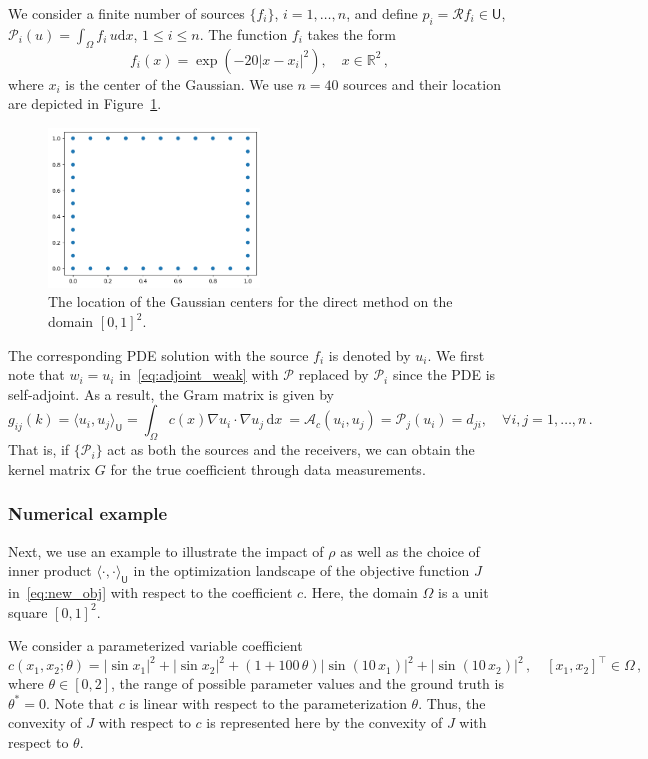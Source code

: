 \documentclass[12pt]{amsart}
\newcommand{\rd}{\mathrm{d}}
\begin{document}
We consider a finite number of sources $\{f_i\}$, $i=1,\ldots, n$, and define $p_i = \mathcal{R} f_i \in \mathsf{U}$, $\mathcal{P}_i(u) = \int_\Omega f_i \, u \rd x $, $1\leq i\leq n$. The function $f_i$ takes the form
\[
f_i(x) = \exp{(-20|x-x_i|^2)},\quad x\in \mathbb{R}^2\,,
\]
where $x_i$ is the center of the Gaussian. We use $n = 40$ sources and their location are depicted in Figure~\ref{fig:centers}.
\begin{figure}
\centering
\includegraphics[width = 0.5\textwidth]{Figures/schrodinger_basis_loc.png}
    \caption{The location of the Gaussian centers for the direct method on the domain $[0,1]^2$.}\label{fig:centers}
\end{figure}
The corresponding PDE solution with the source $f_i$ is denoted by $u_i$. We first note that $w_i = u_i$ in~\eqref{eq:adjoint_weak} with $\mathcal{P}$ replaced by $\mathcal{P}_i$ since the PDE is self-adjoint. As a result, the Gram matrix is given by
\begin{equation}\label{eq:2d_poisson_kernel}
g_{ij}(k) = \langle u_i, u_j\rangle_{\mathsf{U}} = \int_\Omega c(x) \nabla u_i \cdot \nabla u_j  \,  \mathrm{d}x\ = \mathcal{A}_c(u_i,u_j) = \mathcal{P}_j(u_i) = d_{ji},\quad \forall i,j = 1,\ldots, n\,.
\end{equation}
That is, if $\{\mathcal{P}_i\}$ act as both the sources and the receivers, we can obtain the kernel matrix $G$ for the true coefficient through data measurements.

\subsubsection{Numerical example}
Next, we use an example to illustrate the impact of $\rho$ as well as the choice of inner product $\langle \cdot, \cdot \rangle_{\mathsf{U}}$ in the optimization landscape of the objective function $J$ in~\eqref{eq:new_obj} with respect to the coefficient $c$. Here, the domain $\Omega$ is a unit square $[0,1]^2$.

We consider a parameterized variable coefficient 
\[
c(x_1,x_2;\theta) = |\sin x_1|^2 + |\sin x_2|^2+ (1+100\,\theta)|\sin(10\,x_1)|^2 + |\sin(10\,x_2)|^2\,,\quad [x_1,x_2]^\top \in \Omega\,,
\]
where $\theta \in [0,2]$, the range of possible parameter values and the ground truth is $\theta^* = 0$. Note that $c$ is linear with respect to the parameterization $\theta$. Thus, the convexity of $J$ with respect to $c$ is represented here by the convexity of $J$ with respect to $\theta$.
\end{document}

